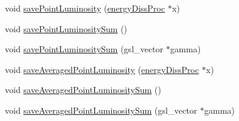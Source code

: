 \begin{DoxyCompactItemize}
\item 
void \hyperlink{classobserver_a9b5776b8a4d70f92cc82630e30b7bfeb}{save\-Point\-Luminosity} (\hyperlink{classenergyDissProc}{energy\-Diss\-Proc} $\ast$x)
\item 
void \hyperlink{classobserver_a6785229b7211bfa2e161e6a27953caf3}{save\-Point\-Luminosity\-Sum} ()
\item 
void \hyperlink{classobserver_a339e054afe8cda7d6707b1b0f8c59127}{save\-Point\-Luminosity\-Sum} (gsl\-\_\-vector $\ast$gamma)
\item 
void \hyperlink{classobserver_aa01a0e777fe58f4b88dd80da83677a62}{save\-Averaged\-Point\-Luminosity} (\hyperlink{classenergyDissProc}{energy\-Diss\-Proc} $\ast$x)
\item 
void \hyperlink{classobserver_a779e4c80cec4aa433fcb204fe0043ed7}{save\-Averaged\-Point\-Luminosity\-Sum} ()
\item 
void \hyperlink{classobserver_a2e7b0b16db25865c6fd6f7ce251ffd5d}{save\-Averaged\-Point\-Luminosity\-Sum} (gsl\-\_\-vector $\ast$gamma)
\end{DoxyCompactItemize}
